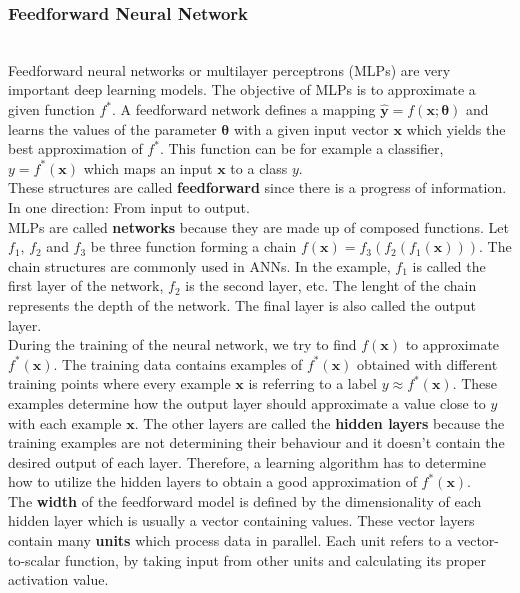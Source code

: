 
\subsubsection{Feedforward Neural Network}~\\

Feedforward neural networks or multilayer perceptrons (MLPs) are very important
deep learning models. The objective of MLPs is to approximate a given function
$f^{*}$. A feedforward network defines a mapping $\bm{\hat{y}} = f(\bm{x};
\bm{\theta})$ and learns the values of the parameter $\bm{\theta}$ with a given
input vector $\bm{x}$ which yields the best approximation of $f^{*}$. This
function can be for example a classifier, $y = f^{*}(\bm{x})$ which maps an
input $\bm{x}$ to a class $y$.\\

These structures are called \textbf{feedforward} since there is a progress of
information. In one direction: From input to output.\\

MLPs are called \textbf{networks} because they are made up of composed
functions. Let $f_{1}$, $f_{2}$ and $f_{3}$ be three function forming a chain
$f(\bm{x}) = f_{3}(f_{2}(f_{1}(\bm{x})))$. The chain structures are commonly
used in ANNs. In the example, $f_{1}$ is called the first layer of the network,
$f_{2}$ is the second layer, etc. The lenght of the chain represents the depth
of the network. The final layer is also called the output layer.\\

During the training of the neural network, we try to find $f(\bm{x})$ to
approximate $f^{*}(\bm{x})$. The training data contains examples of
$f^{*}(\bm{x})$ obtained with different training points where every example
$\bm{x}$ is referring to a label $y \approx f^{*}(\bm{x})$. These examples
determine how the output layer should approximate a value close to $y$ with each
example $\bm{x}$. The other layers are called the \textbf{hidden layers} because
the training examples are not determining their behaviour and it doesn't contain
the desired output of each layer. Therefore, a learning algorithm has to
determine how to utilize the hidden layers to obtain a good approximation of
$f^{*}(\bm{x})$.\\

The \textbf{width} of the feedforward model is defined by the dimensionality of
each hidden layer which is usually a vector containing values. These vector
layers contain many \textbf{units} which process data in parallel. Each unit
refers to a vector-to-scalar function, by taking input from other units and
calculating its proper activation value.\\

